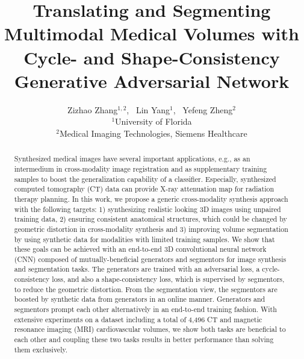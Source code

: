 \documentclass[10pt,twocolumn,letterpaper]{article}
\begin{document}
\title{Translating and Segmenting Multimodal Medical Volumes with Cycle- and Shape-Consistency Generative Adversarial Network}

\author{Zizhao Zhang$^{1,2}$, ~Lin Yang$^1$, ~Yefeng Zheng$^2$ \\
	$^1$University of Florida \\
	 $^2$Medical Imaging Technologies, Siemens Healthcare \\
}

\maketitle

\maketitle
\begin{abstract}
Synthesized medical images have several important applications, e.g., as an intermedium in cross-modality image registration and as supplementary training samples to boost the generalization  capability of a classifier. Especially, synthesized computed tomography (CT) data can provide X-ray attenuation map for radiation therapy planning. In this work, we propose a generic cross-modality synthesis approach with the following targets: 1) synthesizing realistic looking 3D images using unpaired training data, 2) ensuring consistent anatomical structures, which could be changed by geometric distortion in cross-modality synthesis and 3) improving volume segmentation by using synthetic data for modalities with limited training samples. We show that these goals can be achieved with an end-to-end 3D convolutional neural network (CNN) composed of mutually-beneficial generators and segmentors for image synthesis and segmentation tasks. The generators are trained with an adversarial loss, a cycle-consistency loss, and also a shape-consistency loss,  which is supervised by segmentors, to reduce the geometric distortion. From the segmentation view, the segmentors are boosted by synthetic data from generators in an online manner. Generators and segmentors prompt each other alternatively in an end-to-end training fashion. With extensive experiments on a dataset including a total of 4,496 CT and magnetic resonance imaging (MRI) cardiovascular volumes, we show both tasks are beneficial to each other and coupling these two tasks results in better performance than solving them exclusively.
\end{abstract}
\end{document}
